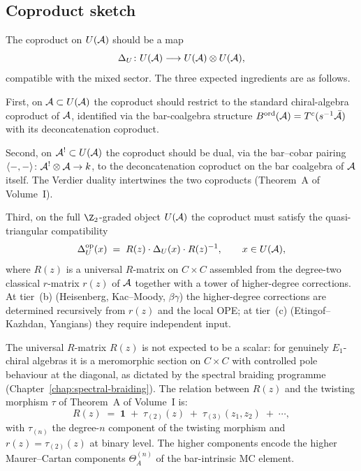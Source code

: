 \subsection{Coproduct sketch}
\label{subsec:drinfeld-e1-coproduct}

The coproduct on $U(\mathcal{A})$ should be a map
\[
\Delta_U \colon U(\mathcal{A}) \longrightarrow U(\mathcal{A}) \otimes U(\mathcal{A}),
\]
compatible with the mixed sector. The three expected ingredients
are as follows.

First, on $\mathcal{A}\subset U(\mathcal{A})$ the coproduct should
restrict to the standard chiral-algebra coproduct of
$\mathcal{A}$, identified via the bar-coalgebra structure
$B^{\mathrm{ord}}(\mathcal{A}) = T^c(s^{-1}\bar{\mathcal{A}})$ with its
deconcatenation coproduct.

Second, on $\mathcal{A}^!\subset U(\mathcal{A})$ the coproduct should be
dual, via the bar--cobar pairing
$\langle-,-\rangle\colon\mathcal{A}^!\otimes\mathcal{A}\to k$, to the
deconcatenation coproduct on the bar coalgebra of $\mathcal{A}$
itself. The Verdier duality intertwines the two
coproducts (Theorem~A of Volume~I).

Third, on the full $\Z_2$-graded object $U(\mathcal{A})$ the
coproduct must satisfy the quasi-triangular compatibility
\begin{equation}
\label{eq:drinfeld-e1-qt-compat}
\Delta_U^{\mathrm{op}}(x)
\;=\;R(z)\cdot \Delta_U(x)\cdot R(z)^{-1},
\qquad x\in U(\mathcal{A}),
\end{equation}
where $R(z)$ is a universal $R$-matrix on $C\times C$
assembled from the degree-two classical $r$-matrix $r(z)$
of $\mathcal{A}$ together with a tower of higher-degree corrections.
At tier~(b) (Heisenberg, Kac--Moody, $\beta\gamma$) the
higher-degree corrections are determined recursively from
$r(z)$ and the local OPE; at tier~(c) (Etingof--Kazhdan,
Yangians) they require independent input.

The universal $R$-matrix $R(z)$ is not expected to be a
scalar: for genuinely $E_1$-chiral algebras it is a
meromorphic section on $C\times C$ with controlled pole
behaviour at the diagonal, as dictated by the spectral
braiding programme
(Chapter~\ref{chap:spectral-braiding}). The relation
between $R(z)$ and the twisting morphism $\tau$ of
Theorem~A of Volume~I is:
\begin{equation}
\label{eq:drinfeld-e1-R-tau}
R(z)
\;=\;\mathbf{1}
\;+\;\tau_{(2)}(z)
\;+\;\tau_{(3)}(z_1,z_2)
\;+\;\cdots,
\end{equation}
with $\tau_{(n)}$ the degree-$n$ component of the
twisting morphism and $r(z) = \tau_{(2)}(z)$ at binary
level. The higher components encode the
higher Maurer--Cartan components $\Theta_A^{(n)}$ of the
bar-intrinsic MC element.

